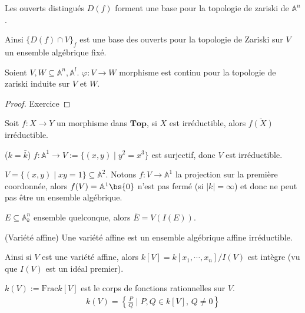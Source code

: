         \begin{exo}
            Les ouverts distingués $D(f)$ forment une base pour la topologie de zariski de $\mathbb{A}^n$.
        \end{exo}
        Ainsi $\{D(f) \cap V\}_f$ est une base des ouverts pour la topologie de Zariski sur $V$ un ensemble algébrique fixé.
        \begin{prop}
            Soient $V,W \subseteq \mathbb{A}^n, \mathbb{A}^l$. $\varphi : V \to W$ morphisme est continu pour la topologie de zariski induite sur $V$ et $W$.
        \end{prop}
        \begin{proof}
            Exercice
        \end{proof}
        \begin{exo}
            Soit $f : X \to Y$ un morphisme dans $\mathbf{Top}$, si $X$ est irréductible, alors $\overline{f(X)}$ irréductible.
        \end{exo}
        \begin{expl}
            ($k = \bar k$) $f : \mathbb{A}^1 \to V := \{(x,y) \mid y^2 = x^3\}$ est surjectif, donc $V$ est irréductible.
        \end{expl}
        \begin{expl}
            $V = \{(x,y) \mid xy = 1\} \subseteq \mathbb{A}^2$. Notons $f : V \to \mathbb{A}^1$ la projection sur la première coordonnée, alors $f(V) = \mathbb{A}^1 \bs \{0\}$ n'est pas fermé (si $|k| = \infty$) et donc ne peut pas être un ensemble algébrique.
        \end{expl}
        \begin{exo}
            $E \subseteq \mathbb{A}^n_k$ ensemble quelconque, alors $\bar E = V(I(E))$.
        \end{exo}
        \begin{defi} (Variété affine)
            Une variété affine est un ensemble algébrique affine irréductible.
        \end{defi}
        Ainsi si $V$ est une variété affine, alors $k[V] = k[x_1, \cdots, x_n]/I(V)$ est intègre (vu que $I(V)$ est un idéal premier).
        \begin{defi}
            $k(V) := \mathrm{Frac} k[V]$ est le corps de fonctions rationnelles sur $V$.
            \begin{align*}
                k(V) = \left\{ \frac{P}{Q} \mid P,Q \in k[V],\, Q \neq 0 \right\}
            \end{align*}
        \end{defi}
